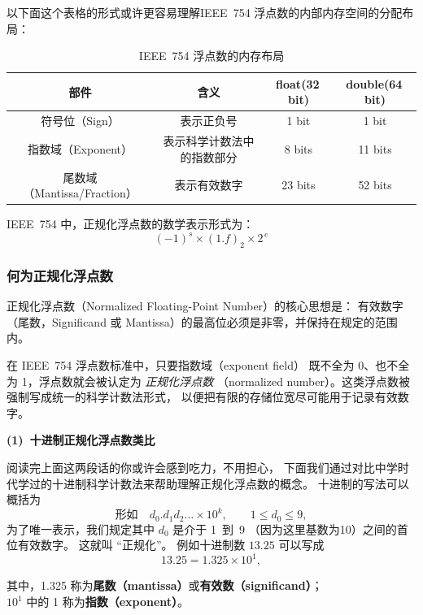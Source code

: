 以下面这个表格的形式或许更容易理解IEEE~754 浮点数的内部内存空间的分配布局：


\begin{table}[htbp]
\centering
\caption{IEEE~754 浮点数的内存布局}
\label{tab:ieee754-layout}
\begin{tabular}{c|c|c|c}
\hline
部件 & 含义 & float(32\,bit) & double(64\,bit) \\
\hline
符号位（Sign） & 表示正负号 & 1 bit & 1 bit \\
指数域（Exponent） & 表示科学计数法中的指数部分 & 8 bits & 11 bits \\
尾数域（Mantissa/Fraction） & 表示有效数字 & 23 bits & 52 bits \\
\hline
\end{tabular}
\end{table}


IEEE~754 中，正规化浮点数的数学表示形式为：
\[
(-1)^s \times (1.f)_2 \times 2^{\,e}
\]




\newpage
\subsubsection{何为正规化浮点数}
正规化浮点数（Normalized Floating-Point Number）的核心思想是：
有效数字（尾数，Significand 或 Mantissa）的最高位必须是非零，并保持在规定的范围内。

在 IEEE~754 浮点数标准中，只要指数域（exponent field）
既不全为 0、也不全为 1，浮点数就会被认定为 \emph{正规化浮点数}
（normalized number）。这类浮点数被强制写成统一的科学计数法形式，
以便把有限的存储位宽尽可能用于记录有效数字。

\vspace{1em}
\noindent\textbf{(1)~十进制正规化浮点数类比}\par\vspace{0.5em}

阅读完上面这两段话的你或许会感到吃力，不用担心，
下面我们通过对比中学时代学过的十进制科学计数法来帮助理解正规化浮点数的概念。
十进制的写法可以概括为
\[
\text{形如}\quad d_0.d_1d_2\ldots \times 10^k,\qquad 1 \le d_0 \le 9,
\]
为了唯一表示，我们规定其中 $d_0$ 是介于 1~到~9 （因为这里基数为10）之间的首位有效数字。
这就叫 “正规化”。
例如十进制数 $13.25$ 可以写成
\[
13.25 = 1.325 \times 10^{1},
\]

\begin{footnotesize}
\noindent
其中，1.325 称为\textbf{尾数（mantissa）}或\textbf{有效数（significand）}；\\
$10^{1}$ 中的 1 称为\textbf{指数（exponent）}。
\end{footnotesize}
\vspace{1em}



